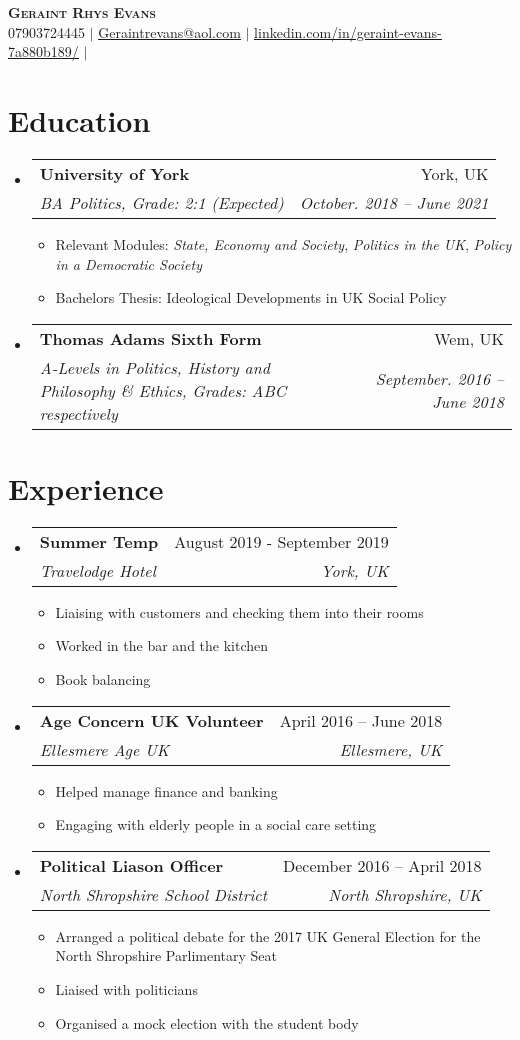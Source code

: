 \documentclass[letterpaper,11pt]{article}
\makeatletter
\newcommand{\resumeItem}[1]{
  \item\small{
    {#1 \vspace{-2pt}}
  }
}
\newcommand{\resumeSubheading}[4]{
  \vspace{-2pt}\item
    \begin{tabular*}{0.97\textwidth}[t]{l@{\extracolsep{\fill}}r}
      \textbf{#1} & #2 \\
      \textit{\small#3} & \textit{\small #4} \\
    \end{tabular*}\vspace{-7pt}
}
\newcommand{\resumeSubHeadingListStart}{\begin{itemize}[leftmargin=0.15in, label={}]}
\newcommand{\resumeSubHeadingListEnd}{\end{itemize}}
\newcommand{\resumeItemListStart}{\begin{itemize}}
\newcommand{\resumeItemListEnd}{\end{itemize}\vspace{-5pt}}
\makeatother
\begin{document}
\begin{center}
    \textbf{\Huge \scshape Geraint Rhys Evans} \\ \vspace{5pt}
    \small 07903724445 $|$ \href{mailto:x@x.com}{\underline{Geraintrevans@aol.com}} $|$ 
    \href{https://www.linkedin.com/in/geraint-evans-7a880b189/}{\underline{linkedin.com/in/geraint-evans-7a880b189/}} $|$
\end{center}


\section{Education}
  \resumeSubHeadingListStart
    \resumeSubheading
      {University of York}{York, UK}
      {BA Politics, Grade: 2:1 (Expected)}{October. 2018 -- June 2021}
        \resumeItemListStart
        \resumeItem{Relevant Modules: \textit{State, Economy and Society}, \textit{Politics in the UK}, \textit{Policy in a Democratic Society} }
        \resumeItem{Bachelors Thesis: Ideological Developments in UK Social Policy}
        \resumeItemListEnd
    \resumeSubheading
      {Thomas Adams Sixth Form}{Wem, UK}
      {A-Levels in Politics, History and Philosophy \& Ethics, Grades: ABC respectively}{September. 2016 -- June 2018}
  \resumeSubHeadingListEnd


\section{Experience}
  \resumeSubHeadingListStart

    \resumeSubheading
    {Summer Temp}{August 2019 - September 2019}
      {Travelodge Hotel}{York, UK}
      \resumeItemListStart
        \resumeItem{Liaising with customers and checking them into their rooms}
        \resumeItem{Worked in the bar and the kitchen}
        \resumeItem{Book balancing}  
    \resumeItemListEnd


    \resumeSubheading
    {Age Concern UK Volunteer}{April 2016 -- June 2018}
     {Ellesmere Age UK}{Ellesmere, UK}
     \resumeItemListStart   
        \resumeItem{Helped manage finance and banking}
        \resumeItem{Engaging with elderly people in a social care setting}
     \resumeItemListEnd

    \resumeSubheading
    {Political Liason Officer}{December 2016 -- April 2018}
    {North Shropshire School District}{North Shropshire, UK}
    \resumeItemListStart
        \resumeItem{Arranged a political debate for the 2017 UK General Election for the North Shropshire Parlimentary Seat}
        \resumeItem{Liaised with politicians}
        \resumeItem{Organised a mock election with the student body}
    \resumeItemListEnd
 \resumeSubHeadingListEnd
\end{document}
